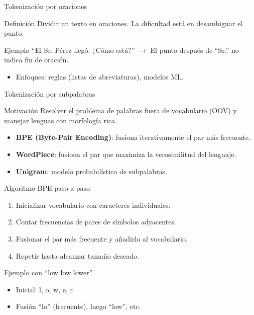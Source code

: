 \documentclass[aspectratio=169, 10pt, xcolor=table]{beamer}
\begin{document}
\begin{frame}{Tokenización por oraciones}
    \begin{block}{Definición}
        Dividir un texto en oraciones. La dificultad está en desambiguar el punto.
    \end{block}
    \begin{exampleblock}{Ejemplo}
        ``El Sr. Pérez llegó. ¿Cómo está?'' $\rightarrow$ El punto después de ``Sr.'' no indica fin de oración.
    \end{exampleblock}
    \begin{itemize}
        \item Enfoques: reglas (listas de abreviaturas), modelos ML.
    \end{itemize}
\end{frame}

\begin{frame}{Tokenización por subpalabras}
    \begin{block}{Motivación}
        Resolver el problema de palabras fuera de vocabulario (OOV) y manejar lenguas con morfología rica.
    \end{block}
    \begin{itemize}
        \item \textbf{BPE (Byte-Pair Encoding)}: fusiona iterativamente el par más frecuente.
        \item \textbf{WordPiece}: fusiona el par que maximiza la verosimilitud del lenguaje.
        \item \textbf{Unigram}: modelo probabilístico de subpalabras.
    \end{itemize}
\end{frame}

\begin{frame}{Algoritmo BPE paso a paso}
    \begin{enumerate}
        \item Inicializar vocabulario con caracteres individuales.
        \item Contar frecuencias de pares de símbolos adyacentes.
        \item Fusionar el par más frecuente y añadirlo al vocabulario.
        \item Repetir hasta alcanzar tamaño deseado.
    \end{enumerate}
    \begin{exampleblock}{Ejemplo con ``low low lower''}
        \begin{itemize}
            \item Inicial: l, o, w, e, r
            \item Fusión ``lo'' (frecuente), luego ``low'', etc.
        \end{itemize}
    \end{exampleblock}
\end{frame}
\end{document}
